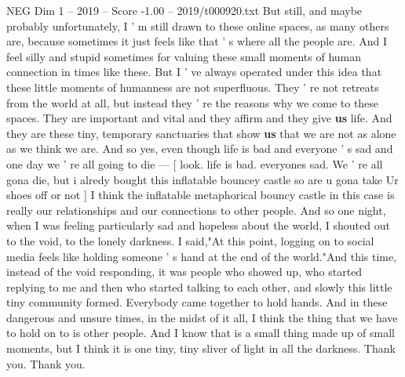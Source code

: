 \begin{textsample}{NEG Dim 1 – 2019 – Score -1.00 – 2019/t000920.txt}
But still, and maybe probably unfortunately, I ' m still drawn to these online spaces, as many others are, because sometimes it just feels like that ' s where all the people are.
And I feel silly and stupid sometimes for valuing these small moments of human connection in times like these.
But I ' ve always operated under this idea that these little moments of humanness are not superfluous.
They ' re not retreats from the world at all, but instead they ' re the reasons why we come to these spaces.
They are important and vital and they affirm and they give \textbf{us} life.
And they are these tiny, temporary sanctuaries that show \textbf{us} that we are not as alone as we think we are.
And so yes, even though life is bad and everyone ' s sad and one day we ' re all going to die — [ look. life is bad. everyones sad.
We ' re all gona die, but i alredy bought this inflatable bouncey castle so are u gona take Ur shoes off or not ] I think the inflatable metaphorical bouncy castle in this case is really our relationships and our connections to other people.
And so one night, when I was feeling particularly sad and hopeless about the world, I shouted out to the void, to the lonely darkness.
I said,"At this point, logging on to social media feels like holding someone ' s hand at the end of the world."And this time, instead of the void responding, it was people who showed up, who started replying to me and then who started talking to each other, and slowly this little tiny community formed.
Everybody came together to hold hands.
And in these dangerous and unsure times, in the midst of it all, I think the thing that we have to hold on to is other people.
And I know that is a small thing made up of small moments, but I think it is one tiny, tiny sliver of light in all the darkness.
Thank you.
Thank you.

\end{textsample}
